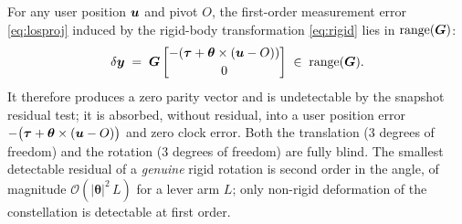 \begin{lemma}
\label{lem:rigid}
For any user position $\bm{u}$ and pivot $O$, the first-order measurement error
\eqref{eq:losproj} induced by the rigid-body transformation \eqref{eq:rigid} lies in
$\operatorname{range}(\bm{G})$:
\begin{equation}
  \delta\bm{y} \;=\; \bm{G}\begin{bmatrix}-(\bm\tau+\bm\theta\times(\bm{u}-O))\\[2pt] 0\end{bmatrix}
  \;\in\;\operatorname{range}(\bm{G}).
  \label{eq:rigidinrange}
\end{equation}
It therefore produces a zero parity vector and is undetectable by the snapshot residual
test; it is absorbed, without residual, into a user position error
$-\bigl(\bm\tau+\bm\theta\times(\bm{u}-O)\bigr)$ and zero clock error. Both the translation
($3$ degrees of freedom) and the rotation ($3$ degrees of freedom) are fully blind. The
smallest detectable residual of a \emph{genuine} rigid rotation is second order in the
angle, of magnitude $\mathcal{O}(|\bm\theta|^2\,L)$ for a lever arm $L$; only non-rigid
deformation of the constellation is detectable at first order.
\end{lemma}

